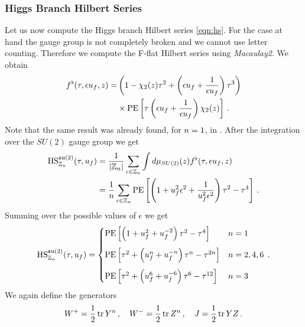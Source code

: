 \documentclass[main.tex]{subfiles}
\begin{document}
\subsubsection{Higgs Branch Hilbert Series}
Let us now compute the Higgs branch Hilbert series \eqref{eqn:hs}. For the case at hand the gauge group is not completely broken and we cannot use letter counting. Therefore we compute the F-flat Hilbert series using \textit{Macaulay2}. We obtain
\begin{equation}
\begin{aligned}
f^{\flat}(\tau,\epsilon u_f,z)=&\left(1-\chi_2(z)\tau^2+\left(\epsilon u_f+\frac{1}{\epsilon  u_f}\right)\tau^3\right)\\
&\times\operatorname{\mathrm{PE}}\left[\tau\left(\epsilon u_f+\frac{1}{\epsilon u_f}\right)\chi_2(z)\right] \, .
\end{aligned}
\end{equation}
Note that the same result was already found, for $n=1$, in \cite{Hanany:2010qu}. After the integration over the $SU(2)$ gauge group we get
\begin{equation}
\begin{aligned}
\textrm{HS}_{\mathbb{Z}_{n}}^{\mathfrak{su}(2)}(\tau,u_f)& = \frac{1}{|\mathbb{Z}_{n}|}\sum_{\epsilon \in \mathbb{Z}_{n}}\int d\mu_{SU(2)}(z)f^{\flat}(\tau,\epsilon u_f,z)\\
&= \frac{1}{n}\sum_{\epsilon \in \mathbb{Z}_{n}}\operatorname{\mathrm{PE}}\left[\left(1+u_f^2\epsilon^2+\frac{1}{u_f^{2}\epsilon^{2}}\right)\tau^2-\tau^4\right]\,.
\end{aligned}
\end{equation}
Summing over the possible values of $\epsilon$ we get
\begin{equation}
\textrm{HS}_{\mathbb{Z}_{n}}^{\mathfrak{su}(2)}(\tau,u_f) = \begin{cases}\operatorname{\mathrm{PE}}\left[\left(1+u_f^2+u_f^{-2}\right)\tau^2-\tau^4\right]&{n}=1\\[10pt]
\operatorname{\mathrm{PE}}\left[\tau^2+\left(u_f^{n}+u_f^{-{n}}\right)\tau^{n}-\tau^{2{n}}\right]&{n}=2,4,6\\[10pt]
\operatorname{\mathrm{PE}}\left[\tau^2+\left(u_f^6+u_f^{-6}\right)\tau^6-\tau^{12}\right]&{n}=3\\ 
\end{cases}\, .
\end{equation}
We again define the generators 
\begin{equation}
W^+=\frac{1}{2}\operatorname{tr} Y^{n}\,,\quad W^-=\frac{1}{2}\operatorname{tr} Z^{n}\,,\quad J=\frac{1}{2}\operatorname{tr} YZ\,.
\end{equation}
\end{document}
